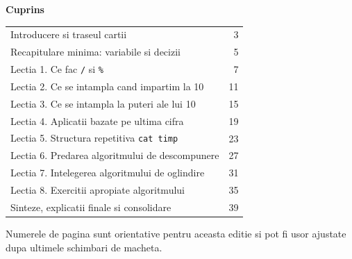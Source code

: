 \pagecolor{white}
\color{black}
\thispagestyle{empty}
\begin{center}
{\Huge\bfseries Cuprins}\par
\vspace{1.2em}
\end{center}

\begin{tabularx}{\linewidth}{@{}Xr@{}}
Introducere si traseul cartii & 3 \\
Recapitulare minima: variabile si decizii & 5 \\
Lectia 1. Ce fac \texttt{/} si \texttt{\%} & 7 \\
Lectia 2. Ce se intampla cand impartim la 10 & 11 \\
Lectia 3. Ce se intampla la puteri ale lui 10 & 15 \\
Lectia 4. Aplicatii bazate pe ultima cifra & 19 \\
Lectia 5. Structura repetitiva \texttt{cat timp} & 23 \\
Lectia 6. Predarea algoritmului de descompunere & 27 \\
Lectia 7. Intelegerea algoritmului de oglindire & 31 \\
Lectia 8. Exercitii apropiate algoritmului & 35 \\
Sinteze, explicatii finale si consolidare & 39 \\
\end{tabularx}

\vspace{1.2em}

\begin{tcolorbox}[colback=white,colframe=black!55,boxrule=0.7pt,arc=1.5mm]
\small
Numerele de pagina sunt orientative pentru aceasta editie si pot fi usor ajustate dupa ultimele schimbari de macheta.
\end{tcolorbox}

\clearpage
\pagestyle{fancy}
\pagecolor{cqbg}
\color{cqtext}
